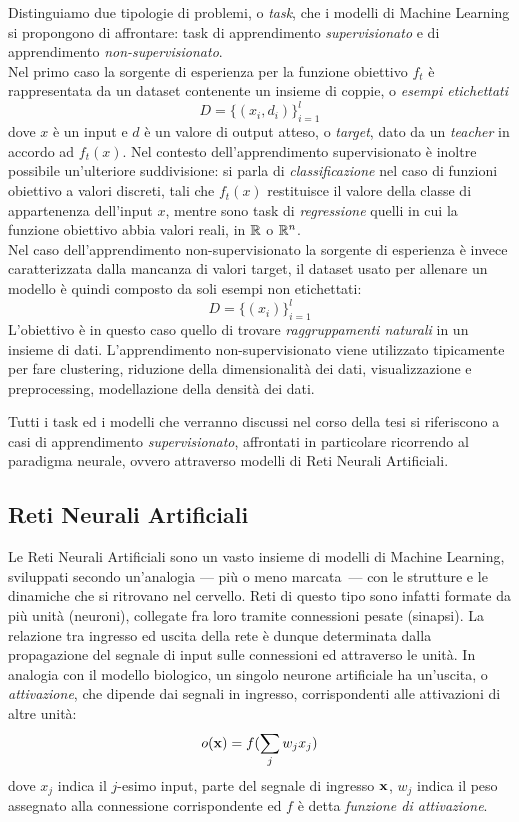 Distinguiamo due tipologie di problemi, o \emph{task}, che i modelli di Machine Learning si propongono di affrontare: task di apprendimento \emph{supervisionato} e di apprendimento \emph{non-supervisionato}. \\
Nel primo caso la sorgente di esperienza per la funzione obiettivo $f_t$ è rappresentata da un dataset contenente un insieme di coppie, o \emph{esempi etichettati}
\[ D = \lbrace (x_i, d_i) \rbrace_{i=1}^{l} \]
dove $x$ è un input e $d$ è un valore di output atteso, o \emph{target}, dato da un \emph{teacher} in accordo ad $f_t(x)$.
Nel contesto dell'apprendimento supervisionato è inoltre possibile un'ulteriore suddivisione: si parla di \emph{classificazione} nel caso di funzioni obiettivo a valori discreti, tali che $f_t(x)$ restituisce il valore della classe di appartenenza dell'input $x$, mentre sono task di \emph{regressione} quelli in cui la funzione obiettivo abbia valori reali, in $\mathbb{R}$ o $\mathbb{R}^n$.\\
Nel caso dell'apprendimento non-supervisionato la sorgente di esperienza è invece caratterizzata dalla mancanza di valori target, il dataset usato per allenare un modello è quindi composto da soli esempi non etichettati:
\[ D = \lbrace (x_i) \rbrace_{i=1}^{l} \]
L'obiettivo è in questo caso quello di trovare \emph{raggruppamenti naturali} in un insieme di dati. L'apprendimento non-supervisionato viene utilizzato tipicamente per fare clustering, riduzione della dimensionalità dei dati, visualizzazione e preprocessing, modellazione della densità dei dati.


Tutti i task ed i modelli che verranno discussi nel corso della tesi si riferiscono a casi di apprendimento \emph{supervisionato}, affrontati in particolare ricorrendo al paradigma neurale, ovvero attraverso modelli di Reti Neurali Artificiali.


\subsection{Reti Neurali Artificiali}\label{intro:ann}
Le Reti Neurali Artificiali \cite{Haykin:NN,Bishop:NNFPR} sono un vasto insieme di modelli di Machine Learning, sviluppati secondo un'analogia --- più o meno marcata~--- con le strutture e le dinamiche che si ritrovano nel cervello. Reti di questo tipo sono infatti formate da più unità (neuroni), collegate fra loro tramite connessioni pesate (sinapsi). La relazione tra ingresso ed uscita della rete è dunque determinata dalla propagazione del segnale di input sulle connessioni ed attraverso le unità.
In analogia con il modello biologico, un singolo neurone artificiale ha un'uscita, o \emph{attivazione}, che dipende dai segnali in ingresso, corrispondenti alle attivazioni di altre unità:
\begin{equation}\label{eq:intro:neurone}
o(\mathbf{x}) = f( \sum_{j} w_{j} x_{j} )
\end{equation}
dove $x_j$ indica il $j$-esimo input, parte del segnale di ingresso $\mathbf{x}$, $w_{j}$ indica il peso assegnato alla connessione corrispondente ed $f$ è detta \emph{funzione di attivazione}.  

